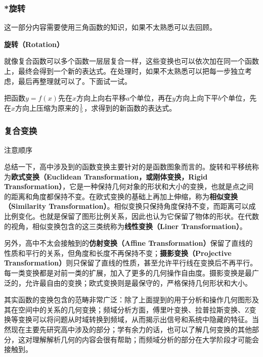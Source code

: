 \subsubsection{*旋转}

这一部分内容需要使用三角函数的知识，如果不太熟悉可以去回顾。

\textbf{旋转（Rotation）}


就像复合函数可以多个函数一层层复合一样，这些变换也可以依次加在同一个函数上，最终会得到一个新的表达式。在处理时，如果不太熟悉可以把每一步独立考虑，最后再整理就可以了。下面试一试。
\begin{exercise}{把函数$y=f(x)$先在$x$方向上向右平移$a$个单位，再在$y$方向上向下平$b$个单位，先在$x$方向上压缩为原来的$1\over5$，求得到的新函数的表达式。}

\end{exercise}

\subsubsection{复合变换}

注意顺序

总结一下，高中涉及到的函数变换主要针对的是函数图象而言的。旋转和平移统称为\textbf{欧式变换（Euclidean Transformation，或刚体变换，Rigid Transformation）}，它是一种保持几何对象的形状和大小的变换，也就是点之间的距离和角度都保持不变。在欧式变换的基础上再加上伸缩，称为\textbf{相似变换（Similarity Transformation）}。相似变换只保持角度保持不变，而距离可以成比例变化。也就是保留了图形比例关系，因此也认为它保留了物体的形状。在代数的视角，相似变换包含的这三类统称为\textbf{线性变换（Liner Transformation）}。

另外，高中不太会接触到的\textbf{仿射变换（Affine Transformation）}保留了直线的性质和平行的关系，但角度和长度不再保持不变；\textbf{摄影变换（Projective Transformation）}则只保留了直线的性质，甚至允许平行线在变换后不再平行。每一类变换都是对前一类的扩展，加入了更多的几何操作自由度。摄影变换是最广泛的，允许最自由的变换；欧式变换则是最保守的，严格保持几何形状和大小。

其实函数的变换包含的范畴非常广泛：除了上面提到的用于分析和操作几何图形及其在空间中的关系的几何变换；频域分析方面，傅里叶变换、拉普拉斯变换、Z变换等变换可以将问题从时域转换到频域，从而揭示出信号和系统中隐藏的特征。当然现在主要先研究高中涉及的部分；学有余力的话，也可以了解几何变换的其他部分，这对理解解析几何的内容会很有帮助；而频域分析的部分在大学阶段才可能会接触到。

